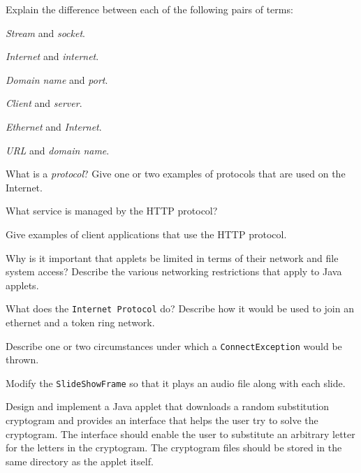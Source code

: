 \begin{EXRtwo}

\item  Explain the difference between each of the following pairs of terms:

\begin{EXRtwoLL}
\begin{multicols}{2}
\item  {\it Stream} and {\it socket}.
\item  {\it Internet} and {\it internet}.
\item  {\it Domain name} and {\it port}.
\item  {\it Client} and {\it server}.
\item  {\it Ethernet} and {\it Internet}.
\item  {\it URL} and {\it domain name}.
\end{multicols}
\end{EXRtwoLL}

\item  What is a {\it protocol}? Give one or two examples
of protocols that are used on the Internet.

\item  What service is managed by the HTTP protocol?

\item  Give examples of client applications that use
the HTTP \mbox{protocol.}

\item  Why is it important that applets be limited
in terms of their network and file system access?  Describe the various
networking restrictions that apply to Java applets.

\item  What does the {\tt Internet Protocol} do?  Describe
how it would be used to join an ethernet
and a token ring network.

\item  Describe one or two circumstances under which
a {\tt Connect\-Exception} would be thrown.

\item  Modify the {\tt SlideShowFrame} so that it plays
an audio file along with each slide.

\item  Design and implement a Java applet that downloads
a random substitution cryptogram and provides an interface that
helps the user try to solve the cryptogram.  The interface should
enable the user to substitute an arbitrary letter for the
letters in the cryptogram.  The cryptogram files should be
stored in the same directory as the applet itself.


\end{EXRtwo}
